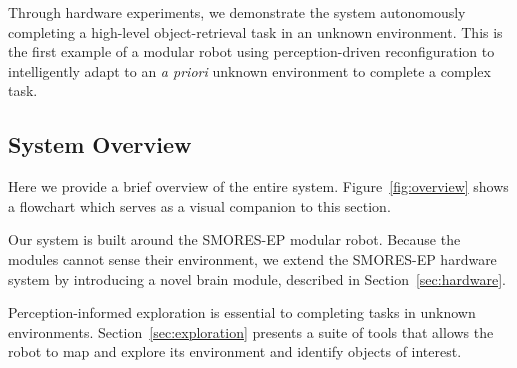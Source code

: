 \documentclass[conference]{IEEEtran}
\begin{document}
Through hardware experiments, we demonstrate the system autonomously completing a high-level object-retrieval task in an unknown environment. This is the first example of a modular robot using perception-driven reconfiguration to intelligently adapt to an \emph{a priori} unknown environment to complete a complex task.



%
\subsection{System Overview}
%
Here we provide a brief overview of the entire system.  Figure~\ref{fig:overview} shows a flowchart which serves as a visual companion to this section. 

Our system is built around the SMORES-EP modular robot. Because the modules cannot sense their environment, we extend the SMORES-EP hardware system by introducing a novel brain module, described in Section~\ref{sec:hardware}.

Perception-informed exploration is essential to completing tasks in unknown environments.  Section~\ref{sec:exploration} presents a suite of tools that allows the robot to map and explore its environment and identify objects of interest. 
\end{document}
